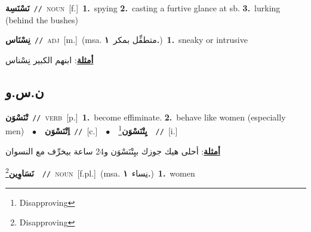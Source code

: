 \documentclass[10pt,a4paper,twoside]{article} %
\begin{document}
\begin{multicols}{2}
{\setlength\topsep{0pt}\textbf{\foreignlanguage{arabic}{نَسْنَسِة}}\ {\color{gray}\texttt{//}\color{black}}\ \textsc{noun}\ [f.]\ \textbf{1.}~spying  \textbf{2.}~casting a furtive glance at sb.  \textbf{3.}~lurking (behind the bushes)\ } \vspace{2mm}

{\setlength\topsep{0pt}\textbf{\foreignlanguage{arabic}{نِسْنَاس}}\ {\color{gray}\texttt{//}\color{black}}\ \textsc{adj}\ [m.]\ \color{gray}(msa. \foreignlanguage{arabic}{متطفِّل بمكر}~\foreignlanguage{arabic}{\textbf{١.}})\color{black}\ \textbf{1.}~sneaky or intrusive\  \begin{flushright}\color{gray}\foreignlanguage{arabic}{\textbf{\underline{\foreignlanguage{arabic}{أمثلة}}}: ابنهم الكبير نِسْناس}\end{flushright}\color{black}} \vspace{2mm}

\vspace{-3mm}
\subsection*{\color{blue}\foreignlanguage{arabic}{ن.س.و}\color{blue}{}} 

{\setlength\topsep{0pt}\textbf{\foreignlanguage{arabic}{تْنَسْوَن}}\ {\color{gray}\texttt{//}\color{black}}\ \textsc{verb}\ [p.]\ \textbf{1.}~become effiminate.  \textbf{2.}~behave like women (especially men)\ \ $\bullet$\ \ \setlength\topsep{0pt}\textbf{\foreignlanguage{arabic}{اِتْنَسْوَن}}\ {\color{gray}\texttt{//}\color{black}}\ [c.]\ \ $\bullet$\ \ \setlength\topsep{0pt}\textbf{\foreignlanguage{arabic}{يِتْنَسْوَن}}\footnote{Disapproving}\ \ {\color{gray}\texttt{//}\color{black}}\ [i.]\  \begin{flushright}\color{gray}\foreignlanguage{arabic}{\textbf{\underline{\foreignlanguage{arabic}{أمثلة}}}: أحلى هيك جوزك بيِتْنَسْوَن و24 ساعة بيخرِّف مع النسوان}\end{flushright}\color{black}} \vspace{2mm}

{\setlength\topsep{0pt}\textbf{\foreignlanguage{arabic}{نَسَاوِين}}\footnote{Disapproving}\ \ {\color{gray}\texttt{//}\color{black}}\ \textsc{noun}\ [f.pl.]\ \color{gray}(msa. \foreignlanguage{arabic}{نِساء}~\foreignlanguage{arabic}{\textbf{١.}})\color{black}\ \textbf{1.}~women\ } \vspace{2mm}


\end{multicols}
\end{document}
